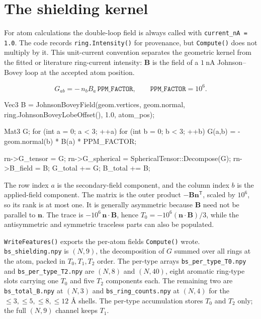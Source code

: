 \documentclass[11pt]{article}
\newcommand{\code}[1]{\texttt{#1}}
\begin{document}
\section{The shielding kernel}

For atom calculations the double-loop field is always called with
\code{current\_nA = 1.0}. The code records \code{ring.Intensity()} for
provenance, but \code{Compute()} does not multiply by it. This unit-current
convention separates the geometric kernel from the fitted or literature
ring-current intensity: \(\bm B\) is the field of a \(\SI{1}{\nano\ampere}\)
Johnson--Bovey loop at the accepted atom position.

\[
  G_{ab} = -\,n_b B_a\,\code{PPM\_FACTOR},
  \qquad \code{PPM\_FACTOR}=10^6 .
\]

\begin{codebox}
Vec3 B = JohnsonBoveyField(geom.vertices, geom.normal,
                           ring.JohnsonBoveyLobeOffset(), 1.0, atom_pos);

Mat3 G;
for (int a = 0; a < 3; ++a)
    for (int b = 0; b < 3; ++b)
        G(a,b) = -geom.normal(b) * B(a) * PPM_FACTOR;

rn->G_tensor = G;
rn->G_spherical = SphericalTensor::Decompose(G);
rn->B_field = B;
G_total += G;
B_total += B;
\end{codebox}

The row index \(a\) is the secondary-field component, and the column index
\(b\) is the applied-field component. The matrix is the outer product
\(-\bm B\bm n^{\mathsf T}\), scaled by \(10^6\), so its rank is at most one.
It is generally asymmetric because \(\bm B\) need not be parallel to
\(\bm n\). The trace is \(-10^6\,\bm n\cdot\bm B\), hence
\(T_0=-10^6(\bm n\cdot\bm B)/3\), while the antisymmetric and symmetric
traceless parts can also be populated.

\code{WriteFeatures()} exports the per-atom fields \code{Compute()} wrote.
\code{bs\_shielding.npy} is \((N,9)\), the decomposition of \(G\) summed over all
rings at the atom, packed in \(T_0,T_1,T_2\) order. The per-type arrays
\code{bs\_per\_type\_T0.npy} and \code{bs\_per\_type\_T2.npy} are \((N,8)\) and
\((N,40)\), eight aromatic ring-type slots carrying one \(T_0\) and five \(T_2\)
components each. The remaining two are \code{bs\_total\_B.npy} at \((N,3)\) and
\code{bs\_ring\_counts.npy} at \((N,4)\) for the \(\le3,\le5,\le8,\le12\)
\(\si{\angstrom}\) shells. The per-type accumulation stores
\(T_0\) and \(T_2\) only; the full \((N,9)\) channel keeps \(T_1\).
\end{document}
